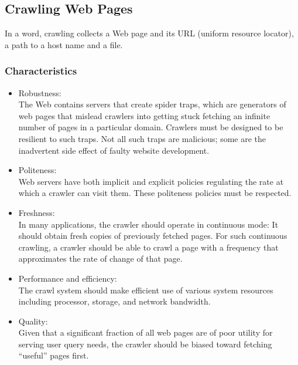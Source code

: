 \documentclass{article}
\begin{document}
\subsection{Crawling Web Pages}
In a word, crawling collects a Web page and its URL (uniform resource
locator), a path to a host name and a file.
\subsubsection{Characteristics}
\begin{itemize}
    \item Robustness:\\
    The Web contains servers that create spider traps, which are generators of web pages that mislead crawlers into getting stuck fetching an infinite number of  pages in a particular domain. Crawlers must be designed to be resilient to such traps. Not all such traps are malicious; some are the inadvertent side effect of faulty website development.
    \item Politeness:\\
    Web servers have both implicit and explicit policies regulating the rate at which a crawler can visit them. These politeness policies must be respected.
    \item Freshness:\\
    In many applications, the crawler should operate in continuous mode: It should obtain fresh copies of previously fetched pages. For such continuous crawling, a crawler should be able to crawl a page with a frequency that approximates the rate of change of that page.
    \item Performance and efficiency:\\
    The crawl system should make efficient use of various system resources including processor, storage, and network bandwidth.
    \item Quality: \\
    Given that a significant fraction of all web pages are of poor utility for serving user query needs, the crawler should be biased toward fetching “useful” pages first.
\end{itemize}
\end{document}

